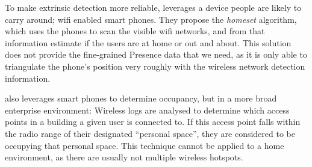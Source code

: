 \documentclass[../thesis/thesis.tex]{subfiles}
\begin{document}
To make extrinsic detection more reliable, \cite{kleiminger2013inferring} leverages a device people are likely to carry around; wifi enabled smart phones. They propose the \textit{homeset} algorithm, which uses the phones to scan the visible wifi networks, and from that information estimate if the users are at home or out and about. This solution does not provide the fine-grained Presence data that we need, as it is only able to triangulate the phone's position very roughly with the wireless network detection information.

\cite{balaji2013sentinel} also leverages smart phones to determine occupancy, but in a more broad enterprise environment: Wireless logs are analysed to determine which access points in a building a given user is connected to. If this access point falls within the radio range of their designated ``personal space'', they are considered to be occupying that personal space. This technique cannot be applied to a home environment, as there are usually not multiple wireless hotspots.
\end{document}
